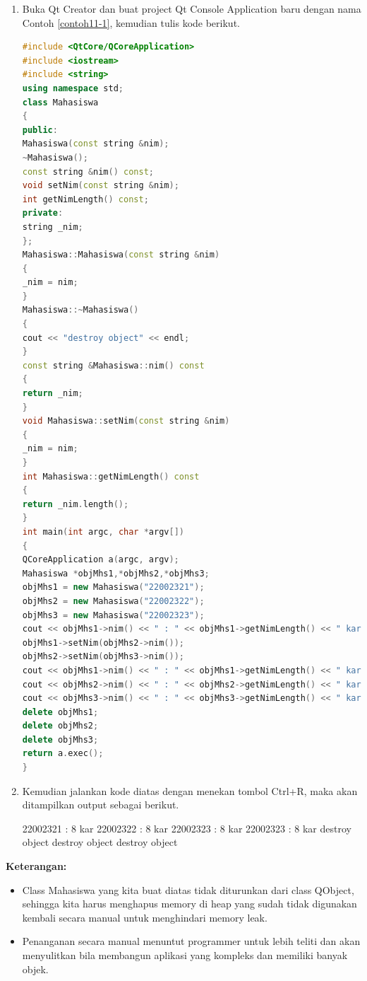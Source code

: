 \begin{enumerate}

\item
  Buka Qt Creator dan buat project Qt Console Application baru dengan
  nama Contoh \ref{contoh11-1}, kemudian tulis kode berikut.

\begin{lstlisting}[language=c++, caption= Alokasi memory dinamis tanpa QObject, label=contoh11-1]
#include <QtCore/QCoreApplication>
#include <iostream>
#include <string>
using namespace std;
class Mahasiswa
{
public:
Mahasiswa(const string &nim);
~Mahasiswa();
const string &nim() const;
void setNim(const string &nim);
int getNimLength() const;
private:
string _nim;
};
Mahasiswa::Mahasiswa(const string &nim)
{
_nim = nim;
}
Mahasiswa::~Mahasiswa()
{
cout << "destroy object" << endl;
}
const string &Mahasiswa::nim() const
{
return _nim;
}
void Mahasiswa::setNim(const string &nim)
{
_nim = nim;
}
int Mahasiswa::getNimLength() const
{
return _nim.length();
}
int main(int argc, char *argv[])
{
QCoreApplication a(argc, argv);
Mahasiswa *objMhs1,*objMhs2,*objMhs3;
objMhs1 = new Mahasiswa("22002321");
objMhs2 = new Mahasiswa("22002322");
objMhs3 = new Mahasiswa("22002323");
cout << objMhs1->nim() << " : " << objMhs1->getNimLength() << " kar" << endl;
objMhs1->setNim(objMhs2->nim());
objMhs2->setNim(objMhs3->nim());
cout << objMhs1->nim() << " : " << objMhs1->getNimLength() << " kar" << endl;
cout << objMhs2->nim() << " : " << objMhs2->getNimLength() << " kar" << endl;
cout << objMhs3->nim() << " : " << objMhs3->getNimLength() << " kar" << endl;
delete objMhs1;
delete objMhs2;
delete objMhs3;
return a.exec();
}
\end{lstlisting}
\item
  Kemudian jalankan kode diatas dengan menekan tombol Ctrl+R, maka akan
  ditampilkan output sebagai berikut.
  
\begin{lcverbatim}
22002321 : 8 kar
22002322 : 8 kar
22002323 : 8 kar
22002323 : 8 kar
destroy object
destroy object
destroy object
\end{lcverbatim}
\end{enumerate}

\textbf{Keterangan:}

\begin{itemize}

\item
  Class Mahasiswa yang kita buat diatas tidak diturunkan dari class
  QObject, sehingga kita harus menghapus memory di heap yang sudah tidak
  digunakan kembali secara manual untuk menghindari memory leak.
\item
  Penanganan secara manual menuntut programmer untuk lebih teliti dan
  akan menyulitkan bila membangun aplikasi yang kompleks dan memiliki
  banyak objek.
\end{itemize}

